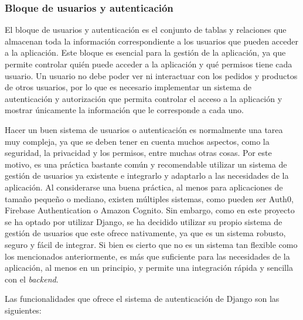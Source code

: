 \subsubsection{Bloque de usuarios y autenticación}
\label{subsubsec:usuarios_autenticacion}

El bloque de usuarios y autenticación es el conjunto de tablas y relaciones que almacenan toda la información correspondiente a los usuarios que pueden acceder a la aplicación. Este bloque es esencial para la gestión de la aplicación, ya que permite controlar quién puede acceder a la aplicación y qué permisos tiene cada usuario. Un usuario no debe poder ver ni interactuar con los pedidos y productos de otros usuarios, por lo que es necesario implementar un sistema de autenticación y autorización que permita controlar el acceso a la aplicación y mostrar únicamente la información que le corresponde a cada uno.

Hacer un buen sistema de usuarios o autenticación es normalmente una tarea muy compleja, ya que se deben tener en cuenta muchos aspectos, como la seguridad, la privacidad y los permisos, entre muchas otras cosas. Por este motivo, es una práctica bastante común y recomendable utilizar un sistema de gestión de usuarios ya existente e integrarlo y adaptarlo a las necesidades de la aplicación. Al considerarse una buena práctica, al menos para aplicaciones de tamaño pequeño o mediano, existen múltiples sistemas, como pueden ser Auth0, Firebase Authentication o Amazon Cognito. Sin embargo, como en este proyecto se ha optado por utilizar Django, se ha decidido utilizar su propio sistema de gestión de usuarios que este ofrece nativamente, ya que es un sistema robusto, seguro y fácil de integrar. Si bien es cierto que no es un sistema tan flexible como los mencionados anteriormente, es más que suficiente para las necesidades de la aplicación, al menos en un principio, y permite una integración rápida y sencilla con el \textit{backend}.

Las funcionalidades que ofrece el sistema de autenticación de Django son las siguientes:

